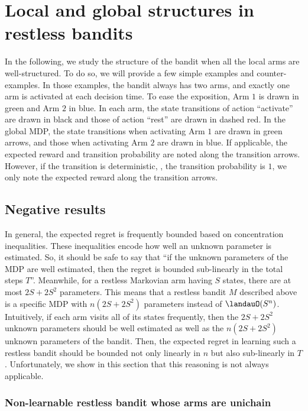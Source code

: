 \section{Local and global structures in restless bandits}
\label{ch:restless:sec:example}

In the following, we study the structure of the bandit when all the local arms are well-structured.
To do so, we will provide a few simple examples and counter-examples.
In those examples, the bandit always has two arms, and exactly one arm is activated at each decision time.
To ease the exposition, Arm $1$ is drawn in green and Arm $2$ in blue.
In each arm, the state transitions of action ``activate'' are drawn in black and those of action ``rest'' are drawn in dashed red.
In the global MDP, the state transitions when activating Arm $1$ are drawn in green arrows, and those when activating Arm $2$ are drawn in blue.
If applicable, the expected reward and transition probability are noted along the transition arrows.
However, if the transition is deterministic, \ie, the transition probability is $1$, we only note the expected reward along the transition arrows.

\subsection{Negative results}

In general, the expected regret is frequently bounded based on concentration inequalities. 
These inequalities encode how well an unknown parameter is estimated.
So, it should be safe to say that ``if the unknown parameters of the MDP are well estimated, then the regret is bounded sub-linearly in the total steps $T$''.
Meanwhile, for a restless Markovian arm having $S$ states, there are at most $2S+2S^2$ parameters.
This means that a restless bandit $M$ described above is a specific MDP with $n(2S+2S^2)$ parameters instead of $\landauO(S^{n})$.
Intuitively, if each arm visits all of its states frequently, then the $2S+2S^2$ unknown parameters should be well estimated as well as the $n(2S+2S^2)$ unknown parameters of the bandit.
Then, the expected regret in learning such a restless bandit should be bounded not only linearly in $n$ but also sub-linearly in $T$.
Unfortunately, we show in this section that this reasoning is not always applicable.

\subsubsection{Non-learnable restless bandit whose arms are unichain}

